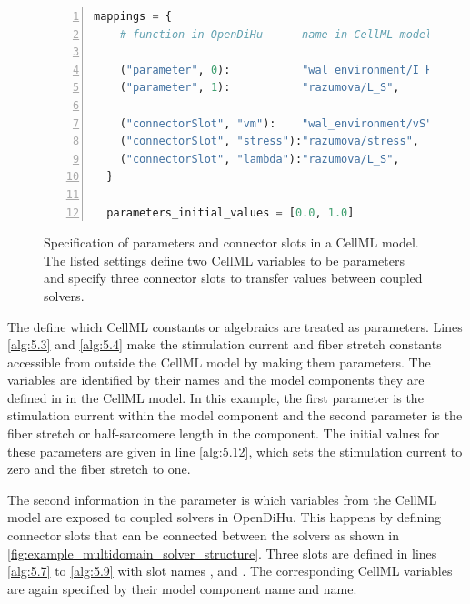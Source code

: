 \begin{figure}
\centering
\begin{framed}
\begin{lstlisting}[basicstyle=\small\ttfamily,commentstyle=\color{gray},numbers=left,language=python]
  mappings = {
    # function in OpenDiHu      name in CellML model    # comment
    
    ("parameter", 0):           "wal_environment/I_HH", # I_stim (constant)   $\label{alg:5.3}$
    ("parameter", 1):           "razumova/L_S",         # $\textcolor{gray}{\lambda}$ (constant)      $\label{alg:5.4}$
    
    ("connectorSlot", "vm"):    "wal_environment/vS",   # $\textcolor{gray}{V_m}$ (state)            $\label{alg:5.7}$
    ("connectorSlot", "stress"):"razumova/stress",      # $\textcolor{gray}{\gamma}$ (algebraic) $\label{alg:5.8}$
    ("connectorSlot", "lambda"):"razumova/L_S",         # $\textcolor{gray}{\lambda}$ (constant)        $\label{alg:5.9}$
  }
  
  parameters_initial_values = [0.0, 1.0]                # I_stim=0, $\textcolor{gray}{\lambda}$=1                    $\label{alg:5.12}$
\end{lstlisting}
\end{framed}
\caption{Specification of parameters and connector slots in a CellML model. The listed settings define two CellML variables to be parameters and specify three connector slots to transfer values between coupled solvers.}%
\label{fig:example_mapping}%
\end{figure}

The  define which CellML constants or algebraics are treated as parameters. Lines \ref{alg:5.3} and \ref{alg:5.4} make the stimulation current and fiber stretch constants accessible from outside the CellML model by making them parameters. The variables are identified by their names and the model components they are defined in in the CellML model. In this example, the first parameter is the stimulation current  within the  model component and the second parameter is the fiber stretch or half-sarcomere length  in the  component.
The initial values for these parameters are given in line \ref{alg:5.12}, which sets the stimulation current to zero and the fiber stretch to one.

The second information in the  parameter is which variables from the CellML model are exposed to coupled solvers in OpenDiHu. This happens by defining connector slots that can be connected between the solvers as shown in \cref{fig:example_multidomain_solver_structure}.
Three slots are defined in lines \ref{alg:5.7} to \ref{alg:5.9} with slot names ,  and . The corresponding CellML variables are again specified by their model component name and name. 

